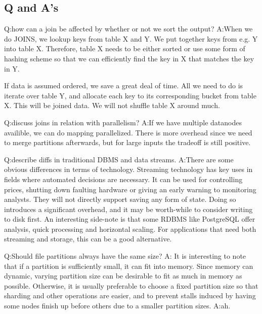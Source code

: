 \subsection{Q and A's}

Q:\@ how can a join be affected by whether or not we sort the output?
\newline A:\@ When we do JOINS, we lookup keys from table X and Y. We put together keys from e.g. Y into table X. Therefore, table X needs to be either sorted or use some form of hashing scheme so that we can efficiently find the key in X that matches the key in Y.

If data is assumed ordered, we save a great deal of time. All we need to do is iterate over table Y, and allocate each key to its corresponding bucket from table X. This will be joined data. We will not shuffle table X around much.  

Q:\@ discuss joins in relation with parallelism?
\newline A:\@ If we have multiple datanodes availible, we can do mapping 
parallelized. There is more overhead since we need to merge partitions afterwards,
but for large inputs the tradeoff is still positive.

Q:\@ describe diffs in traditional DBMS and data streams.
\newline A:\@ There are some obvious differences in terms of technology. Streaming technology has key uses 
in fields where automated decisions are necessary. It can be used for controlling prices, 
shutting down faulting hardware or giving an early warning to monitoring analysts.
They will not directly  support saving any form of state. Doing so introduces a significant overhead,
and it may be worth-while to consider writing to disk first. 
An interesting side-note is that some RDBMS like PostgreSQL offer  analysis, quick processing and horizontal scaling. For applications that need both streaming and storage, this can
be a good alternative.

Q:\@ Should file partitions always have the same size?
A:\@
It is interesting to note that if a partition is sufficiently small, it can fit into memory.
Since memory can dynamic, varying partition size can be desirable to fit as much in memory as possible.
Otherwise, it is usually preferable to choose a fixed partition size so that sharding and 
other operations are easier, and to prevent stalls induced by having some nodes finish up
before others due to a smaller partition sizes.
\newline A:\@ ah.

